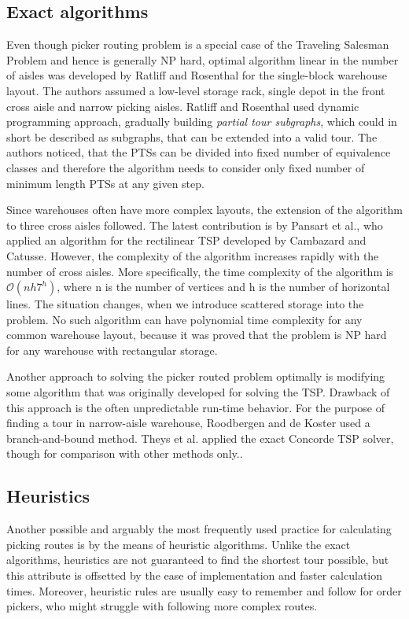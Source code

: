 \subsection{Exact algorithms}
Even though picker routing problem is a special case of the Traveling Salesman Problem and hence is generally NP hard, optimal algorithm linear in the number of aisles was developed by Ratliff and Rosenthal\cite{RR} for the single-block warehouse layout. The authors assumed a low-level storage rack, single depot in the front cross aisle and narrow picking aisles. Ratliff and Rosenthal used dynamic programming approach, gradually building \emph{partial tour subgraphs}, which could in short be described as subgraphs, that can be extended into a valid tour. The authors noticed, that the PTSs can be divided into fixed number of equivalence classes and therefore the algorithm needs to consider only fixed number of minimum length PTSs at any given step.
\par
Since warehouses often have more complex layouts, the extension of the algorithm to three cross aisles followed\cite{roodbergen2001b}. The latest contribution is by Pansart et al.\cite{pansart2018}, who applied an algorithm for the rectilinear TSP developed by Cambazard and Catusse\cite{cambazard}. However, the complexity of the algorithm increases rapidly with the number of cross aisles. More specifically, the time complexity of the algorithm is $\mathcal{O} (nh7^h)$, where n is the number of vertices and h is the number of horizontal lines. The situation changes, when we introduce scattered storage into the problem. No such algorithm can have polynomial time complexity for any common warehouse layout, because it was proved that the problem is NP hard for any warehouse with rectangular storage\cite{weidinger2018}.
\par
Another approach to solving the picker routed problem optimally is modifying some algorithm that was originally developed for solving the TSP. Drawback of this approach is the often unpredictable run-time behavior. For the purpose of finding a tour in narrow-aisle warehouse, Roodbergen and de Koster used a branch-and-bound method\cite{roodbergen2001}. Theys et al. applied the exact Concorde TSP solver, though for comparison with other methods only.\cite{theys2010}.



\subsection{Heuristics}
Another possible and arguably the most frequently used practice for calculating picking routes is by the means of heuristic algorithms. Unlike the exact algorithms, heuristics are not guaranteed to find the shortest tour possible, but this attribute is offsetted by the ease of implementation and faster calculation times. Moreover, heuristic rules are usually easy to remember and follow for order pickers, who might struggle with following more complex routes. \par

